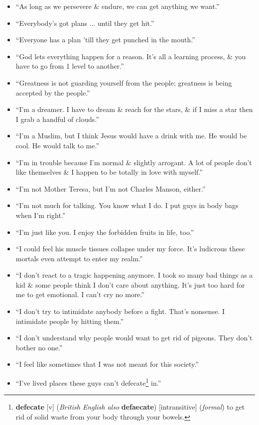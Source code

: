 \documentclass[oneside]{book}
\numberwithin{equation}{section}
\begin{document}
\begin{enumerate}
\begin{itemize}
		\item ``As long as we persevere \& endure, we can get anything we want.''
		\item ``Everybody's got plans $\ldots$ until they get hit.''
		\item ``Everyone has a plan 'till they get punched in the mouth.''
		\item ``God lets everything happen for a reason. It's all a learning process, \& you have to go from 1 level to another.''
		\item ``Greatness is not guarding yourself from the people; greatness is being accepted by the people.''
		\item ``I'm a dreamer. I have to dream \& reach for the stars, \& if I miss a star then I grab a handful of clouds.''
		\item ``I'm a Muslim, but I think Jesus would have a drink with me. He would be cool. He would talk to me.''
		\item ``I'm in trouble because I'm normal \& slightly arrogant. A lot of people don't like themselves \& I happen to be totally in love with myself.''
		\item ``I'm not Mother Teresa, but I'm not Charles Manson, either.''
		\item ``I'm not much for talking. You know what I do. I put guys in body bags when I'm right.''
		\item ``I'm just like you. I enjoy the forbidden fruits in life, too.''
		\item ``I could feel his muscle tissues collapse under my force. It's ludicrous these mortals even attempt to enter my realm.''
		\item ``I don't react to a tragic happening anymore. I took so many bad things as a kid \& some people think I don't care about anything. It's just too hard for me to get emotional. I can't cry no more.''
		\item ``I don't try to intimidate anybody before a fight. That's nonsense. I intimidate people by hitting them.''
		\item ``I don't understand why people would want to get rid of pigeons. They don't bother no one.''
		\item ``I feel like sometimes that I was not meant for this society.''
		\item ``I've lived places these guys can't defecate\footnote{\textbf{defecate} [v] (\textit{British English also} \textbf{defaecate}) [intransitive] (\textit{formal}) to get rid of solid waste from your body through your bowels.} in.''

\end{itemize}
\end{enumerate}
\end{document}

